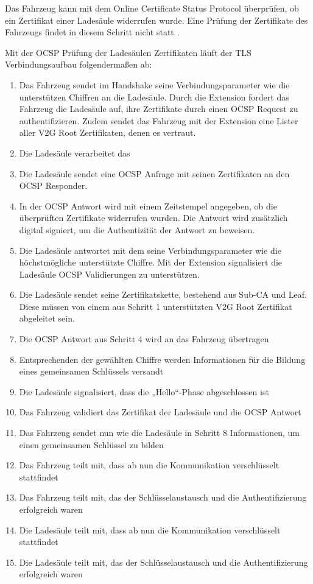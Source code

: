 Das Fahrzeug kann mit dem Online Certificate Status Protocol überprüfen, ob ein Zertifikat einer Ladesäule widerrufen wurde. Eine Prüfung der Zertifikate des Fahrzeugs findet in diesem Schritt nicht statt \cite[S. 10]{pkiInfo}. 

Mit der OCSP Prüfung der Ladesäulen Zertifikaten läuft der TLS Verbindungsaufbau folgendermaßen ab:

\begin{enumerate}
\item Das Fahrzeug sendet im  Handshake seine Verbindungsparameter wie die unterstützen Chiffren an die Ladesäule. Durch die  Extension fordert das Fahrzeug die Ladesäule auf, ihre Zertifikate durch einen OCSP Request zu authentifizieren. Zudem sendet das Fahrzeug mit der  Extension eine Lister aller V2G Root Zertifikaten, denen es vertraut.
\item Die Ladesäule verarbeitet das  
\item Die Ladesäule sendet eine OCSP Anfrage mit seinen Zertifikaten an den OCSP Responder. 
\item In der OCSP Antwort wird mit einem Zeitstempel angegeben, ob die überprüften Zertifikate widerrufen wurden. Die Antwort wird zusätzlich digital signiert, um die Authentizität der Antwort zu beweisen.
\item Die Ladesäule antwortet mit dem  seine Verbindungsparameter wie die höchstmögliche unterstützte Chiffre. Mit der  Extension signalisiert die Ladesäule OCSP Validierungen zu unterstützen.
\item Die Ladesäule sendet seine Zertifikatskette, bestehend aus Sub-CA und Leaf. Diese müssen von einem aus Schritt 1 unterstützten V2G Root Zertifikat abgeleitet sein.
\item Die OCSP Antwort aus Schritt 4 wird an das Fahrzeug übertragen
\item Entsprechenden der gewählten Chiffre werden Informationen für die Bildung eines gemeinsamen Schlüssels versandt
\item Die Ladesäule signalisiert, dass die „Hello“-Phase abgeschlossen ist
\item Das Fahrzeug validiert das Zertifikat der Ladesäule und die OCSP Antwort
\item Das Fahrzeug sendet nun wie die Ladesäule in Schritt 8 Informationen, um einen gemeinsamen Schlüssel zu bilden
\item Das Fahrzeug teilt mit, dass ab nun die Kommunikation verschlüsselt stattfindet
\item Das Fahrzeug teilt mit, das der Schlüsselaustausch und die Authentifizierung erfolgreich waren
\item Die Ladesäule teilt mit, dass ab nun die Kommunikation verschlüsselt stattfindet
\item Die Ladesäule teilt mit, das der Schlüsselaustausch und die Authentifizierung erfolgreich waren
\end{enumerate}

